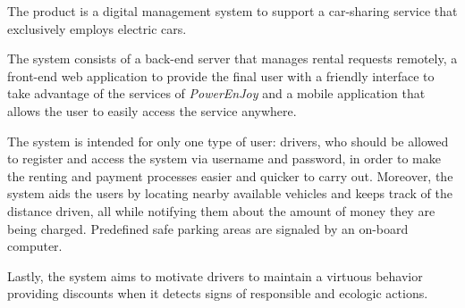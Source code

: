 The product is a digital management system to support a car-sharing service that exclusively employs electric cars.

The system consists of a back-end server that manages rental requests remotely, a front-end web application to provide the final user with a friendly interface to take advantage of the services of \hbox{\emph{PowerEnJoy}} and a mobile application that allows the user to easily access the service anywhere.

The system is intended for only one type of user: drivers, who should be allowed to register and access the system via username and password, in order to make the renting and payment processes easier and quicker to carry out. Moreover, the system aids the users by locating nearby available vehicles and keeps track of the distance driven, all while notifying them about the amount of money they are being charged. Predefined safe parking areas are signaled by an on-board computer.

Lastly, the system aims to motivate drivers to maintain a virtuous behavior providing discounts when it detects signs of responsible and ecologic actions.